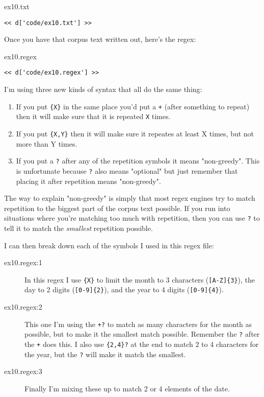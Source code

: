 \begin{code}{ex10.txt}
\begin{Verbatim}
<< d['code/ex10.txt'] >>
\end{Verbatim}
\end{code}

Once you have that corpus text written out, here's the regex:

\begin{code}{ex10.regex}
\begin{Verbatim}
<< d['code/ex10.regex'] >>
\end{Verbatim}
\end{code}

I'm using three new kinds of syntax that all do the same thing:

\begin{enumerate}
\item If you put \verb|{X}| in the same place you'd put a \verb|+| (after
        something to repeat) then it will make sure that it is repeated
        \verb|X| times.
\item If you put \verb|{X,Y}| then it will make sure it repeates at least
    X times, but not more than Y times.
\item If you put a \verb|?| after any of the repetition symbols it means
    "non-greedy".  This is unfortunate because \verb|?| also means
    "optional" but just remember that placing it after repetition means
    "non-greedy".
\end{enumerate}

The way to explain "non-greedy" is simply that most regex engines try to 
match repetition to the biggest part of the corpus text possible.  If you
run into situations where you're matching too much with repetition, then
you can use \verb|?| to tell it to match the \emph{smallest} repetition
possible.

I can then break down each of the symbols I used in this regex file:

\begin{description}
\item[ex10.regex:1] In this regex I use \verb|{X}| to limit the month to
    3 characters (\verb|[A-Z]{3}|), the day to 2 digits (\verb|[0-9]{2}|), and
    the year to 4 digits (\verb|[0-9]{4}|).
\item[ex10.regex:2] This one I'm using the \verb|+?| to match as many characters
    for the month as possible, but to make it the smallest match possible.  Remember
    the \verb|?| after the \verb|+| does this.  I also use \verb|{2,4}?| at the
    end to match 2 to 4 characters for the year, but the \verb|?| will make 
    it match the smallest.
\item[ex10.regex:3] Finally I'm mixing these up to match 2 or 4 elements of
    the date.
\end{description}



